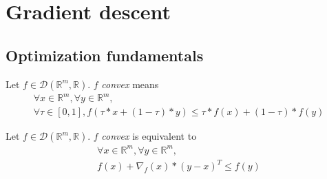 \documentclass[11pt,en]{elegantpaper}
\newcommand{\Real}{\mathbb{R}}
\begin{document}
\section{Gradient descent}

\subsection{Optimization fundamentals}

\begin{definition}
  Let $f \in \mathcal{D}(\Real^m,\Real)$. $f$ \textit{convex} means \begin{equation}\label{def:convex_eq}
    \begin{gathered}
      \forall x \in \Real^m, \forall y \in \Real^m, \\
      \forall \tau \in [0,1], f(\tau * x + (1 - \tau) * y) \leq \tau * f(x) + (1 - \tau) * f(y)
    \end{gathered}
  \end{equation}
\end{definition}

\begin{proposition}
  {\normalfont
    Let $f \in \mathcal{D}(\Real^m,\Real)$. $f$ \textit{convex} is equivalent to \begin{equation}\label{prop:convex_grad}
      \begin{gathered}
        \forall x \in \Real^m, \forall y \in \Real^m, \\
        f(x) + \nabla_f(x) * (y - x)^T \leq f(y)
      \end{gathered}
    \end{equation}
  }
\end{proposition}
\end{document}
